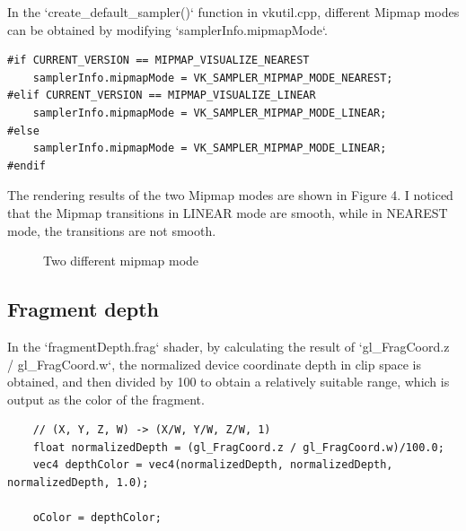 \documentclass[10pt]{article}
\begin{document}
\noindent In the `create\_default\_sampler()` function in vkutil.cpp, different Mipmap modes can be obtained by modifying `samplerInfo.mipmapMode`.

\begin{lstlisting}
#if CURRENT_VERSION == MIPMAP_VISUALIZE_NEAREST
    samplerInfo.mipmapMode = VK_SAMPLER_MIPMAP_MODE_NEAREST;
#elif CURRENT_VERSION == MIPMAP_VISUALIZE_LINEAR
    samplerInfo.mipmapMode = VK_SAMPLER_MIPMAP_MODE_LINEAR;
#else
    samplerInfo.mipmapMode = VK_SAMPLER_MIPMAP_MODE_LINEAR;
#endif
\end{lstlisting}

\noindent The rendering results of the two Mipmap modes are shown in Figure 4.
 I noticed that the Mipmap transitions in LINEAR mode are smooth, while in NEAREST mode, the transitions are not smooth.

\begin{figure}[htbp]
	\centering
    \caption{Two different mipmap mode}
\end{figure}

\subsection{Fragment depth}

\noindent In the `fragmentDepth.frag` shader, by calculating the result of `gl\_FragCoord.z / gl\_FragCoord.w`, the normalized device coordinate depth in clip space is obtained, and then divided by 100 to obtain a relatively suitable range, which is output as the color of the fragment.

\begin{lstlisting}
    // (X, Y, Z, W) -> (X/W, Y/W, Z/W, 1)
    float normalizedDepth = (gl_FragCoord.z / gl_FragCoord.w)/100.0;
    vec4 depthColor = vec4(normalizedDepth, normalizedDepth, normalizedDepth, 1.0);

    oColor = depthColor;
\end{lstlisting}
\end{document}
